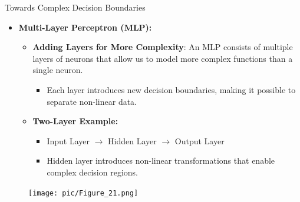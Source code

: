 \documentclass[serif, aspectratio=169]{beamer}
\begin{document}
    \begin{frame}{Towards Complex Decision Boundaries}
        \begin{itemize}
            \item \textbf{Multi-Layer Perceptron (MLP):}
            \medskip
            \begin{itemize}\itemsep1em
            \item \justifying \textbf{Adding Layers for More Complexity}:
            An MLP consists of multiple layers of neurons that allow us to model more complex functions than a single neuron.
            \begin{itemize}
                \item \justifying Each layer introduces new decision boundaries, making it possible to separate non-linear data.
            \end{itemize}
            \item \justifying \textbf{Two-Layer Example:}
            \begin{itemize}
                \item Input Layer $\rightarrow$ Hidden Layer $\rightarrow$ Output Layer
                \item Hidden layer introduces non-linear transformations that enable complex decision regions.
            \end{itemize}
            \end{itemize}
        \end{itemize}
        \begin{figure}
            \centering
            \texttt{[image: pic/Figure\_21.png]}
        \end{figure}
        \vfill
    \end{frame}
\end{document}
